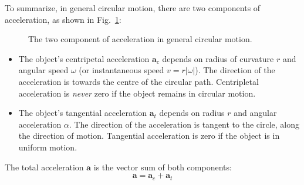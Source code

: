 To summarize, in general circular motion, there are two components of
acceleration, as shown in Fig.~\ref{fig:circular-motion-accelerations}:
\begin{figure}[ht]
  \centering
  \caption{The two component of acceleration in general circular motion.}
  \label{fig:circular-motion-accelerations}
\end{figure}
\begin{itemize}
\item The object's centripetal acceleration $\bm a_c$ depends on radius of
  curvature $r$ and angular speed $\omega$ (or instantaneous speed
  $v=r|\omega|$). The direction of the acceleration is towards the centre of
  the circular path. Centripletal acceleration is \emph{never} zero if the
  object remains in circular motion.
\item The object's tangential acceleration $\bm a_t$ depends on radius $r$
  and angular acceleration $\alpha$. The direction of the acceleration is
  tangent to the circle, along the direction of motion. Tangential acceleration
  is zero if the object is in uniform motion.
\end{itemize}
The total acceleration $\bm a$ is the vector sum of both components:
\begin{equation}
  \bm a = \bm a_c+\bm a_t
\end{equation}



